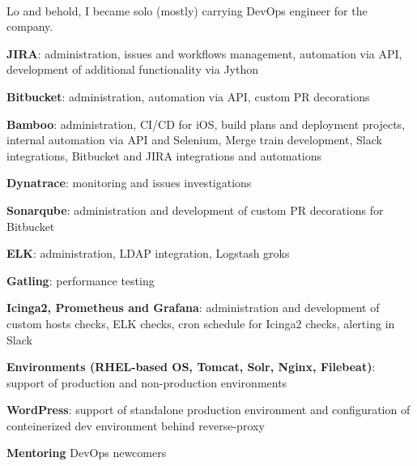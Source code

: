 \documentclass[a4paper]{MagicalCV}
\begin{document}
\begin{minipage}[t]{0.645\textwidth} 


 \\
\vspace{\topsep} %
Lo and behold, I became solo (mostly) carrying DevOps engineer for the company.
\begin{tightemize}
  \item \textbf{JIRA}: administration, issues and workflows management, automation via API,
    development of additional functionality via Jython
  \item \textbf{Bitbucket}: administration, automation via API, custom PR decorations
  \item \textbf{Bamboo}: administration, CI/CD for iOS, build plans and deployment projects,
    internal automation via API and Selenium, Merge train development, Slack integrations,
    Bitbucket and JIRA integrations and automations
  \item \textbf{Dynatrace}: monitoring and issues investigations
  \item \textbf{Sonarqube}: administration and development of custom PR decorations for Bitbucket
  \item \textbf{ELK}: administration, LDAP integration, Logstash groks
  \item \textbf{Gatling}: performance testing
  \item \textbf{Icinga2, Prometheus and Grafana}: administration and development of custom hosts checks,
    ELK checks, cron schedule for Icinga2 checks, alerting in Slack
  \item \textbf{Environments (RHEL-based OS, Tomcat, Solr, Nginx, Filebeat)}: support of production and
    non-production environments
  \item \textbf{WordPress}: support of standalone production environment and configuration of conteinerized
    dev environment behind reverse-proxy
  \item \textbf{Mentoring} DevOps newcomers
\end{tightemize}
\sectionsep


\end{minipage}
\end{document}
